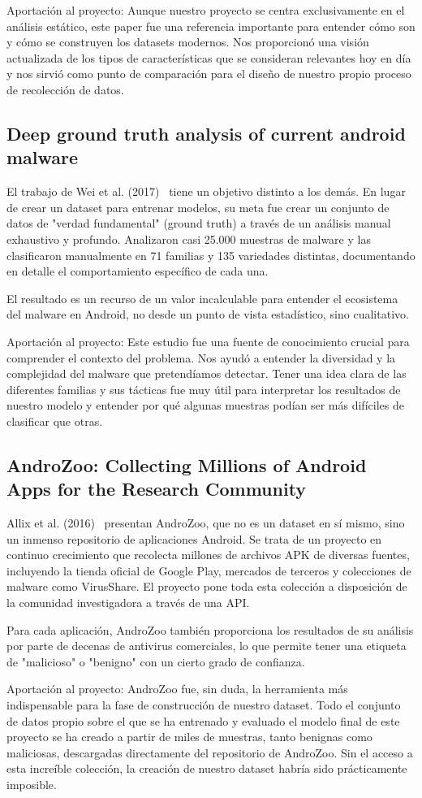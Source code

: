 Aportación al proyecto: Aunque nuestro proyecto se centra exclusivamente en el análisis estático, este paper fue una referencia importante para entender cómo son y cómo se construyen los datasets modernos. Nos proporcionó una visión actualizada de los tipos de características que se consideran relevantes hoy en día y nos sirvió como punto de comparación para el diseño de nuestro propio proceso de recolección de datos.

\subsection{Deep ground truth analysis of current android malware}
El trabajo de Wei et al. (2017)~\cite{wei2017deep} tiene un objetivo distinto a los demás. En lugar de crear un dataset para entrenar modelos, su meta fue crear un conjunto de datos de "verdad fundamental" (ground truth) a través de un análisis manual exhaustivo y profundo. Analizaron casi 25.000 muestras de malware y las clasificaron manualmente en 71 familias y 135 variedades distintas, documentando en detalle el comportamiento específico de cada una.

El resultado es un recurso de un valor incalculable para entender el ecosistema del malware en Android, no desde un punto de vista estadístico, sino cualitativo.

Aportación al proyecto: Este estudio fue una fuente de conocimiento crucial para comprender el contexto del problema. Nos ayudó a entender la diversidad y la complejidad del malware que pretendíamos detectar. Tener una idea clara de las diferentes familias y sus tácticas fue muy útil para interpretar los resultados de nuestro modelo y entender por qué algunas muestras podían ser más difíciles de clasificar que otras.

\subsection{AndroZoo: Collecting Millions of Android Apps for the Research Community}
Allix et al. (2016)~\cite{Allix:2016:ACM:2901739.2903508} presentan AndroZoo, que no es un dataset en sí mismo, sino un inmenso repositorio de aplicaciones Android. Se trata de un proyecto en continuo crecimiento que recolecta millones de archivos APK de diversas fuentes, incluyendo la tienda oficial de Google Play, mercados de terceros y colecciones de malware como VirusShare. El proyecto pone toda esta colección a disposición de la comunidad investigadora a través de una API.

Para cada aplicación, AndroZoo también proporciona los resultados de su análisis por parte de decenas de antivirus comerciales, lo que permite tener una etiqueta de "malicioso" o "benigno" con un cierto grado de confianza.

Aportación al proyecto: AndroZoo fue, sin duda, la herramienta más indispensable para la fase de construcción de nuestro dataset. Todo el conjunto de datos propio sobre el que se ha entrenado y evaluado el modelo final de este proyecto se ha creado a partir de miles de muestras, tanto benignas como maliciosas, descargadas directamente del repositorio de AndroZoo. Sin el acceso a esta increíble colección, la creación de nuestro dataset habría sido prácticamente imposible.
